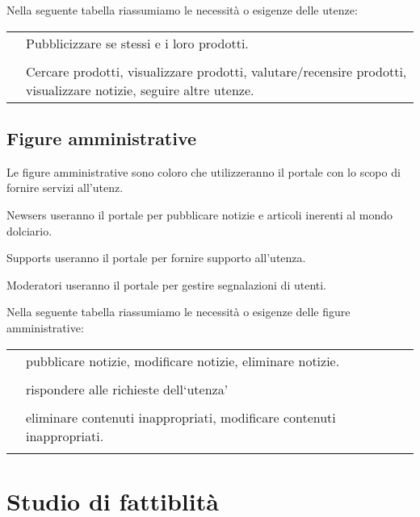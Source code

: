\noindent
Nella seguente tabella riassumiamo le necessità o esigenze delle utenze:
\begin{center}
	\begin{tabularx}{0.8\textwidth}{l X}
	\toprule 
		\tabhead{Utenze} & \tabhead{Necessità o Esigenze} \\
	\midrule
		\ruolo{Produttori} & Pubblicizzare se stessi e i loro prodotti.  \\ \\
		\ruolo{Utenti} & Cercare prodotti, visualizzare prodotti, valutare/recensire prodotti, visualizzare notizie, seguire altre utenze. \\
	\bottomrule
	\end{tabularx}
\end{center}


\subsection{Figure amministrative}
\label{sub:figureamministrative}
Le figure amministrative sono coloro che utilizzeranno il portale con lo scopo di fornire servizi all'utenz.
\begin{descriptionInd}

    \item[Newsers] useranno il portale per pubblicare notizie e articoli inerenti al mondo dolciario.
    
    \item[Supports] useranno il portale per fornire supporto all'utenza.
    
    \item[Moderatori] useranno il portale per gestire segnalazioni di utenti.
\end{descriptionInd}

\noindent
Nella seguente tabella riassumiamo le necessità o esigenze delle figure amministrative:
\begin{center}
	\begin{tabularx}{0.8\textwidth}{l X}
	\toprule 
		\tabhead{Figure Amministrative} & \tabhead{Necessità o Esigenze} \\
	\midrule
		\ruolo{Newsers} & pubblicare notizie, modificare notizie, eliminare notizie.  \\ \\
		\ruolo{Supports} & rispondere alle richieste dell`utenza'  \\ \\
		\ruolo{Moderatori} & eliminare contenuti inappropriati, modificare contenuti inappropriati.  \\ \\
	\bottomrule
	\end{tabularx}
\end{center}


\section{Studio di fattiblità}
\label{sec:studio_di_fatt}


